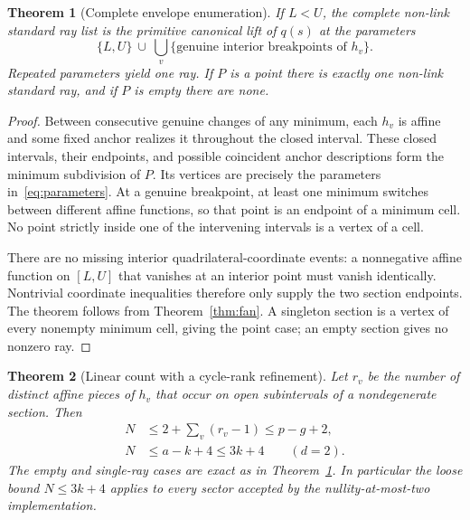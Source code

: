 \documentclass[11pt]{article}
\newtheorem{theorem}{Theorem}[section]
\theoremstyle{definition}
\theoremstyle{remark}
\begin{document}
\begin{theorem}[Complete envelope enumeration]
\label{thm:envelope}
If $L<U$, the complete non-link standard ray list is the primitive canonical
lift of $q(s)$ at the parameters
\begin{equation}
 \{L,U\}\ \cup\ \bigcup_v
 \{\text{genuine interior breakpoints of }h_v\}.
 \label{eq:parameters}
\end{equation}
Repeated parameters yield one ray. If $P$ is a point there is exactly one
non-link standard ray, and if $P$ is empty there are none.
\end{theorem}

\begin{proof}
Between consecutive genuine changes of any minimum, each $h_v$ is affine
and some fixed anchor realizes it throughout the closed interval. These
closed intervals, their endpoints, and possible coincident anchor
descriptions form the minimum subdivision of $P$. Its vertices are precisely
the parameters in~\eqref{eq:parameters}. At a genuine breakpoint, at least
one minimum switches between different affine functions, so that point is
an endpoint of a minimum cell. No point strictly inside one of the intervening
intervals is a vertex of a cell.

There are no missing interior quadrilateral-coordinate events: a nonnegative
affine function on $[L,U]$ that vanishes at an interior point must vanish
identically. Nontrivial coordinate inequalities therefore only supply the
two section endpoints. The theorem follows from
Theorem~\ref{thm:fan}. A singleton section is a vertex of every nonempty
minimum cell, giving the point case; an empty section gives no nonzero ray.
\end{proof}

\begin{theorem}[Linear count with a cycle-rank refinement]
\label{thm:count}
Let $r_v$ be the number of distinct affine pieces of $h_v$ that occur on
open subintervals of a nondegenerate section. Then
\begin{align}
 N&\le 2+\sum_v(r_v-1)\le p-g+2,\label{eq:localcount}\\
 N&\le a-k+4\le3k+4 \qquad(d=2).\label{eq:globalcount}
\end{align}
The empty and single-ray cases are exact as in Theorem~\ref{thm:envelope}.
In particular the loose bound $N\le3k+4$ applies to every sector accepted by
the nullity-at-most-two implementation.
\end{theorem}
\end{document}
